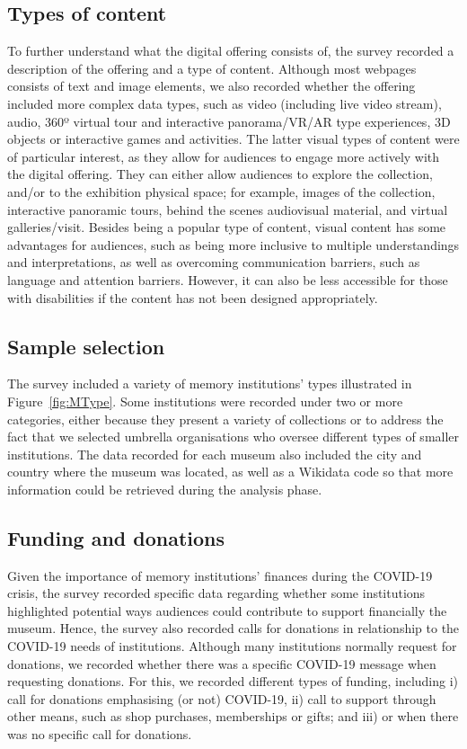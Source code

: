 \documentclass{egpubl}
\begin{document}
\subsection{Types of content}
To further understand what the digital offering consists of, the survey recorded a description of the offering and a type of content. Although most webpages consists of text and image elements, we also recorded whether the offering included more complex data types, such as video (including live video stream), audio, 360º virtual tour and interactive panorama/VR/AR type experiences, 3D objects or interactive games and activities. The latter visual types of content were of particular interest, as they allow for audiences to engage more actively with the digital offering. They can either allow audiences to explore the collection, and/or to the exhibition physical space; for example, images of the collection, interactive panoramic tours,  behind the scenes audiovisual material, and virtual galleries/visit. Besides being a popular type of content, visual content has some advantages for audiences, such as being more inclusive to multiple understandings and interpretations, as well as overcoming communication barriers, such as language and attention barriers. However, it can also be less accessible for those with disabilities if the content has not been designed appropriately.

\subsection{Sample selection}
The survey included a variety of memory institutions’ types illustrated in Figure~\ref{fig:MType}. Some institutions were recorded under two or more categories, either because they present a variety of collections or to address the fact that we selected umbrella organisations who oversee different types of smaller institutions. The data recorded for each museum also included the city and country where the museum was located, as well as a Wikidata code so that more information could be retrieved during the analysis phase.

\subsection{Funding and donations}
Given the importance of memory institutions’ finances during the COVID-19 crisis, the survey recorded specific data regarding whether some institutions highlighted potential ways audiences could contribute to support financially the museum. Hence, the survey also recorded calls for donations in relationship to the COVID-19 needs of institutions. Although many institutions normally request for donations, we recorded whether there was a specific COVID-19 message when requesting donations. For this, we recorded different types of funding, including i) call for donations emphasising (or not)  COVID-19, ii) call to support through other means, such as shop purchases, memberships or gifts; and iii) or when there was no specific call for donations.
\end{document}
